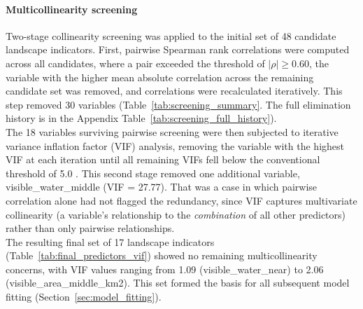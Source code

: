 \documentclass[hidelinks, 11pt]{article}
\begin{document}
\paragraph{Multicollinearity screening}
Two-stage collinearity screening was applied to the initial set of 48 candidate landscape indicators. First, pairwise Spearman rank correlations were computed across all candidates, where a pair exceeded the threshold of $|\rho| \geq 0.60$, the variable with the higher mean absolute correlation across the remaining candidate set was removed, and correlations were recalculated iteratively. This step removed 30 variables (Table~\ref{tab:screening_summary}. The full elimination history is in the Appendix Table~\ref{tab:screening_full_history}).
\\
The 18 variables surviving pairwise screening were then subjected to iterative variance inflation factor (VIF) analysis, removing the variable with the highest VIF at each iteration until all remaining VIFs fell below the conventional threshold of 5.0 \citep{zuur2010}. This second stage removed one additional variable, visible\_water\_middle (VIF = 27.77). That was a case in which pairwise correlation alone had not flagged the redundancy, since VIF captures multivariate collinearity (a variable's relationship to the \textit{combination} of all other predictors) rather than only pairwise relationships.
\\
The resulting final set of 17 landscape indicators (Table~\ref{tab:final_predictors_vif}) showed no remaining multicollinearity concerns, with VIF values ranging from 1.09 (visible\_water\_near) to 2.06 (visible\_area\_middle\_km2). This set formed the basis for all subsequent model fitting (Section~\ref{sec:model_fitting}).
\end{document}
